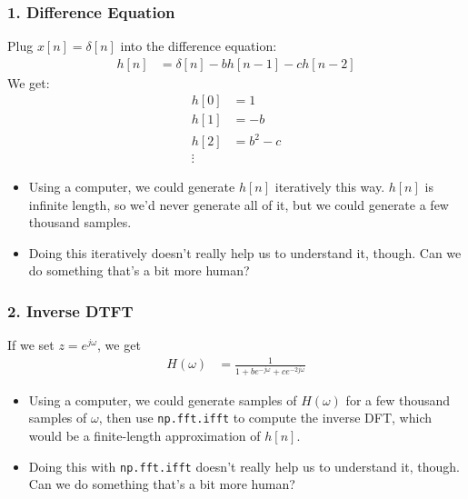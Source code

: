 \documentclass{beamer}
\begin{document}
\begin{frame}
  \frametitle{1. Difference Equation}

  Plug $x[n]=\delta[n]$ into the difference equation:
  \begin{align*}
    h[n] &= \delta[n] - bh[n-1] - c h[n-2]
  \end{align*}
  We get:
  \begin{align*}
    h[0] &= 1\\
    h[1] &= -b\\
    h[2] &= b^2-c\\
    \vdots
  \end{align*}
  \begin{itemize}
  \item Using a computer, we could generate $h[n]$ iteratively this
    way.  $h[n]$ is infinite length, so we'd never generate all of it,
    but we could generate a few thousand samples.
  \item Doing this iteratively doesn't really help us to understand it, though.
    Can we do something that's a bit more human?
  \end{itemize}
\end{frame}

\begin{frame}
  \frametitle{2. Inverse DTFT}

  If we set $z=e^{j\omega}$, we get
  \begin{align*}
    H(\omega) &= \frac{1}{1+be^{-j\omega}+ce^{-2j\omega}}
  \end{align*}
  \begin{itemize}
  \item Using a computer, we could generate samples of $H(\omega)$ for
    a few thousand samples of $\omega$, then use \texttt{np.fft.ifft} to
    compute the inverse DFT, which would be a finite-length
    approximation of $h[n]$.
  \item Doing this with \texttt{np.fft.ifft} doesn't really help us to
    understand it, though.  Can we do something that's a bit more
    human?
  \end{itemize}
\end{frame}
\end{document}
